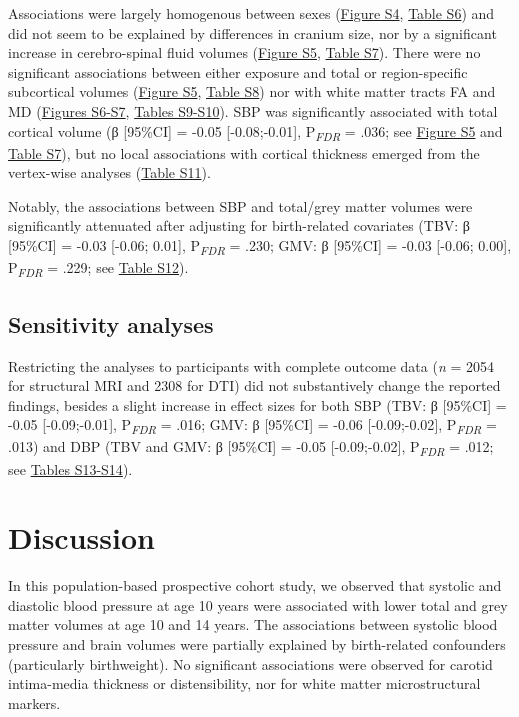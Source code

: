 \documentclass[
  letterpaper,
  DIV=11,
  numbers=noendperiod]{scrreport}
\begin{document}
Associations were largely homogenous between sexes
(\href{https://osf.io/2f4sg}{Figure S4},
\href{https://osf.io/2f4sg}{Table S6}) and did not seem to be explained
by differences in cranium size, nor by a significant increase in
cerebro-spinal fluid volumes (\href{https://osf.io/2f4sg}{Figure S5},
\href{https://osf.io/2f4sg}{Table S7}). There were no significant
associations between either exposure and total or region-specific
subcortical volumes (\href{https://osf.io/2f4sg}{Figure S5},
\href{https://osf.io/2f4sg}{Table S8}) nor with white matter tracts FA
and MD (\href{https://osf.io/2f4sg}{Figures S6-S7},
\href{https://osf.io/2f4sg}{Tables S9-S10}). SBP was significantly
associated with total cortical volume (β {[}95\%CI{]} = -0.05
{[}-0.08;-0.01{]}, P\textsubscript{\emph{FDR}} = .036; see
\href{https://osf.io/2f4sg}{Figure S5} and
\href{https://osf.io/2f4sg}{Table S7}), but no local associations with
cortical thickness emerged from the vertex-wise analyses
(\href{https://osf.io/2f4sg}{Table S11}).

Notably, the associations between SBP and total/grey matter volumes were
significantly attenuated after adjusting for birth-related covariates
(TBV: β {[}95\%CI{]} = -0.03 {[}-0.06; 0.01{]},
P\textsubscript{\emph{FDR}} = .230; GMV: β {[}95\%CI{]} = -0.03
{[}-0.06; 0.00{]}, P\textsubscript{\emph{FDR}} = .229; see
\href{https://osf.io/2f4sg}{Table S12}).

\subsection{Sensitivity analyses}\label{sensitivity-analyses-1}

Restricting the analyses to participants with complete outcome data
(\emph{n} = 2054 for structural MRI and 2308 for DTI) did not
substantively change the reported findings, besides a slight increase in
effect sizes for both SBP (TBV: β {[}95\%CI{]} = -0.05
{[}-0.09;-0.01{]}, P\textsubscript{\emph{FDR}} = .016; GMV: β
{[}95\%CI{]} = -0.06 {[}-0.09;-0.02{]}, P\textsubscript{\emph{FDR}} =
.013) and DBP (TBV and GMV: β {[}95\%CI{]} = -0.05 {[}-0.09;-0.02{]},
P\textsubscript{\emph{FDR}} = .012; see
\href{https://osf.io/2f4sg}{Tables S13-S14}).

\section{Discussion}\label{discussion-5}

In this population-based prospective cohort study, we observed that
systolic and diastolic blood pressure at age 10 years were associated
with lower total and grey matter volumes at age 10 and 14 years. The
associations between systolic blood pressure and brain volumes were
partially explained by birth-related confounders (particularly
birthweight). No significant associations were observed for carotid
intima-media thickness or distensibility, nor for white matter
microstructural markers.
\end{document}

